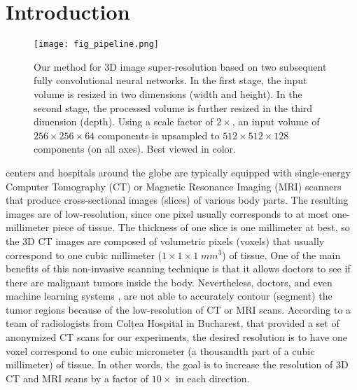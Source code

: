 \documentclass{ieeeaccess}
\begin{document}
\titlepgskip=-15pt

\maketitle

\section{Introduction}

\begin{figure*}[!th]
\centering
\texttt{[image: fig\_pipeline.png]}
\caption{Our method for 3D image super-resolution based on two subsequent fully convolutional neural networks. In the first stage, the input volume is resized in two dimensions (width and height). In the second stage, the processed volume is further resized in the third dimension (depth). Using a scale factor of $2\times$, an input volume of $256\times256\times64$ components is upsampled to $512\times512\times128$ components (on all axes). Best viewed in color.}
\label{fig_pipeline}
\end{figure*}

 centers and hospitals around the globe are typically equipped with single-energy Computer Tomography (CT) or Magnetic Resonance Imaging (MRI) scanners that produce cross-sectional images (slices) of various body parts. The resulting images are of low-resolution, since one pixel usually corresponds to at most one-millimeter piece of tissue. The thickness of one slice is one millimeter at best, so the 3D CT images are composed of volumetric pixels (voxels) that usually correspond to one cubic millimeter ($1 \times 1 \times 1\;mm^3$) of tissue. One of the main benefits of this non-invasive scanning technique is that it allows doctors to see if there are malignant tumors inside the body. Nevertheless, doctors, and even machine learning systems \cite{Sert-MH-2019}, are not able to accurately contour (segment) the tumor regions because of the low-resolution of CT or MRI scans. According to a team of radiologists from Colțea Hospital in Bucharest, that provided a set of anonymized CT scans for our experiments, the desired resolution is to have one voxel correspond to one cubic micrometer (a thousandth part of a cubic millimeter) of tissue. In other words, the goal is to increase the resolution of 3D CT and MRI scans by a factor of $10\times$ in each direction.
\end{document}
